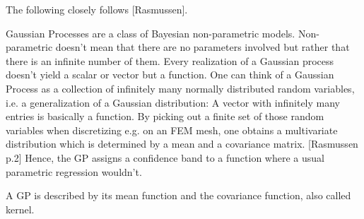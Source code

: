 \documentclass[%
  a4paper,oneside,%
  11pt,%
  smallchapters,
  green,%
  rgb, <cmyk>
  ,]{tubsbook}
\begin{document}
The following closely follows [Rasmussen].


Gaussian Processes are a class of Bayesian non-parametric models. Non-parametric doesn't mean that there are no parameters involved but rather that there is an infinite number of them. Every realization of a Gaussian process doesn't yield a scalar or vector but a function. One can think of a Gaussian Process as a collection of infinitely many normally distributed random variables, i.e. a generalization of a Gaussian distribution: A vector with infinitely many entries is basically a function. By picking out a finite set of those random variables when discretizing e.g. on an FEM mesh, one obtains a multivariate distribution which is determined by a mean and a covariance matrix. [Rasmussen p.2] Hence, the GP assigns a confidence band to a function where a usual parametric regression wouldn't.

A GP is described by its mean function and the covariance function, also called kernel.
\end{document}
